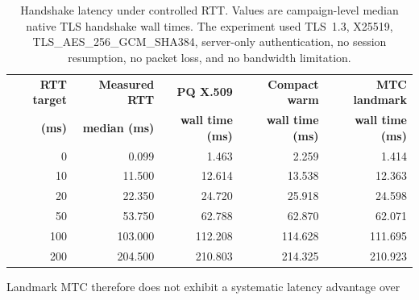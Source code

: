 \documentclass[journal]{IEEEtran}
\begin{document}
\begin{table}[t]

\caption{Handshake latency under controlled RTT. Values are campaign-level median native TLS handshake wall times. The experiment used TLS~1.3, X25519, TLS\_AES\_256\_GCM\_SHA384, server-only authentication, no session resumption, no packet loss, and no bandwidth limitation.}

\label{tab:latency-performance}

\centering

\begin{tabular}{rrrrr}

\toprule

\textbf{RTT target} &

\textbf{Measured RTT} &

\textbf{PQ X.509} &

\textbf{Compact warm} &

\textbf{MTC landmark} \\

\textbf{(ms)} &

\textbf{median (ms)} &

\textbf{wall time (ms)} &

\textbf{wall time (ms)} &

\textbf{wall time (ms)} \\

\midrule

0   & 0.099   & 1.463   & 2.259   & 1.414 \\

10  & 11.500  & 12.614  & 13.538  & 12.363 \\

20  & 22.350  & 24.720  & 25.918  & 24.598 \\

50  & 53.750  & 62.788  & 62.870  & 62.071 \\

100 & 103.000 & 112.208 & 114.628 & 111.695 \\

200 & 204.500 & 210.803 & 214.325 & 210.923 \\

\bottomrule

\end{tabular}

\end{table}



Landmark MTC therefore does not exhibit a systematic latency advantage over
\end{document}
